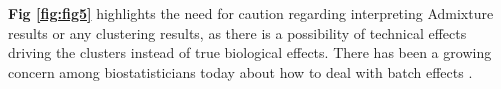 \textbf{Fig \ref{fig:fig5}} highlights the need for caution regarding interpreting Admixture results or any clustering results, as there is a possibility of technical effects driving the clusters instead of true biological effects. There has been a growing concern among biostatisticians today about how to deal with batch effects \cite{Leek2010} \cite{Hicks2015}. 



 








